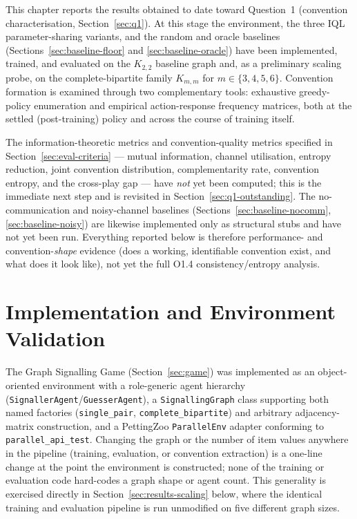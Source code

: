 \documentclass[a4paper,twoside,12pt]{report}
\begin{document}
This chapter reports the results obtained to date toward Question~1
(convention characterisation, Section~\ref{sec:q1}). At this stage the
environment, the three IQL parameter-sharing variants, and the random and
oracle baselines (Sections~\ref{sec:baseline-floor} and
\ref{sec:baseline-oracle}) have been implemented, trained, and evaluated on
the $K_{2,2}$ baseline graph and, as a preliminary scaling probe, on the
complete-bipartite family $K_{m,m}$ for $m \in \{3,4,5,6\}$. Convention
formation is examined through two complementary tools: exhaustive greedy-policy
enumeration and empirical action-response frequency matrices, both at the
settled (post-training) policy and across the course of training itself.

The information-theoretic metrics and convention-quality metrics specified in
Section~\ref{sec:eval-criteria} --- mutual information, channel utilisation,
entropy reduction, joint convention distribution, complementarity rate,
convention entropy, and the cross-play gap --- have \emph{not} yet been
computed; this is the immediate next step and is revisited in
Section~\ref{sec:q1-outstanding}. The no-communication and noisy-channel
baselines (Sections~\ref{sec:baseline-nocomm}, \ref{sec:baseline-noisy}) are
likewise implemented only as structural stubs and have not yet been run.
Everything reported below is therefore performance- and convention-\emph{shape}
evidence (does a working, identifiable convention exist, and what does it look
like), not yet the full O1.4 consistency/entropy analysis.

\section{Implementation and Environment Validation}
\label{sec:results-implementation}

The Graph Signalling Game (Section~\ref{sec:game}) was implemented as an
object-oriented environment with a role-generic agent hierarchy
(\texttt{SignallerAgent}/\texttt{GuesserAgent}), a \texttt{SignallingGraph}
class supporting both named factories (\texttt{single\_pair},
\texttt{complete\_bipartite}) and arbitrary adjacency-matrix construction, and
a PettingZoo \texttt{ParallelEnv} adapter conforming to
\texttt{parallel\_api\_test}. Changing the graph or the number of item values
anywhere in the pipeline (training, evaluation, or convention extraction) is a
one-line change at the point the environment is constructed; none of the
training or evaluation code hard-codes a graph shape or agent count. This
generality is exercised directly in Section~\ref{sec:results-scaling} below,
where the identical training and evaluation pipeline is run unmodified on five
different graph sizes.
\end{document}
